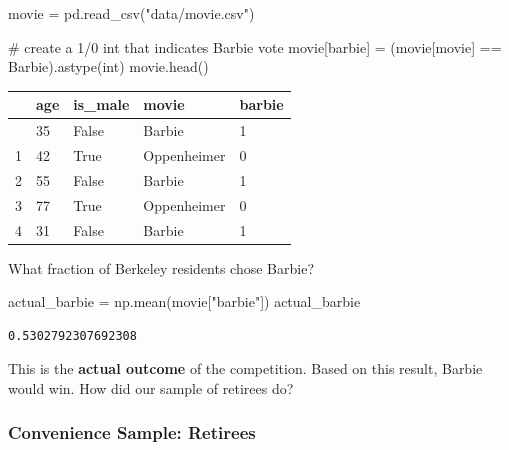 \documentclass[
  letterpaper,
  DIV=11,
  numbers=noendperiod]{scrreprt}
\newenvironment{Shaded}{\begin{snugshade}}{\end{snugshade}}
\newcommand{\BuiltInTok}[1]{\textcolor[rgb]{0.00,0.23,0.31}{#1}}
\newcommand{\CommentTok}[1]{\textcolor[rgb]{0.37,0.37,0.37}{#1}}
\newcommand{\NormalTok}[1]{\textcolor[rgb]{0.00,0.23,0.31}{#1}}
\newcommand{\OperatorTok}[1]{\textcolor[rgb]{0.37,0.37,0.37}{#1}}
\newcommand{\StringTok}[1]{\textcolor[rgb]{0.13,0.47,0.30}{#1}}
\begin{document}
\begin{Shaded}
\begin{Highlighting}[]
\NormalTok{movie }\OperatorTok{=}\NormalTok{ pd.read\_csv(}\StringTok{"data/movie.csv"}\NormalTok{)}

\CommentTok{\# create a 1/0 int that indicates Barbie vote}
\NormalTok{movie[}\StringTok{\textquotesingle{}barbie\textquotesingle{}}\NormalTok{] }\OperatorTok{=}\NormalTok{ (movie[}\StringTok{\textquotesingle{}movie\textquotesingle{}}\NormalTok{] }\OperatorTok{==} \StringTok{\textquotesingle{}Barbie\textquotesingle{}}\NormalTok{).astype(}\BuiltInTok{int}\NormalTok{)}
\NormalTok{movie.head()}
\end{Highlighting}
\end{Shaded}

\begin{longtable}[]{@{}lllll@{}}
\toprule\noalign{}
& age & is\_male & movie & barbie \\
\midrule\noalign{}
\endhead
\bottomrule\noalign{}
\endlastfoot
0 & 35 & False & Barbie & 1 \\
1 & 42 & True & Oppenheimer & 0 \\
2 & 55 & False & Barbie & 1 \\
3 & 77 & True & Oppenheimer & 0 \\
4 & 31 & False & Barbie & 1 \\
\end{longtable}

What fraction of Berkeley residents chose Barbie?

\begin{Shaded}
\begin{Highlighting}[]
\NormalTok{actual\_barbie }\OperatorTok{=}\NormalTok{ np.mean(movie[}\StringTok{"barbie"}\NormalTok{])}
\NormalTok{actual\_barbie}
\end{Highlighting}
\end{Shaded}

\begin{verbatim}
0.5302792307692308
\end{verbatim}

This is the \textbf{actual outcome} of the competition. Based on this
result, Barbie would win. How did our sample of retirees do?

\subsubsection{Convenience Sample:
Retirees}\label{convenience-sample-retirees}
\end{document}
